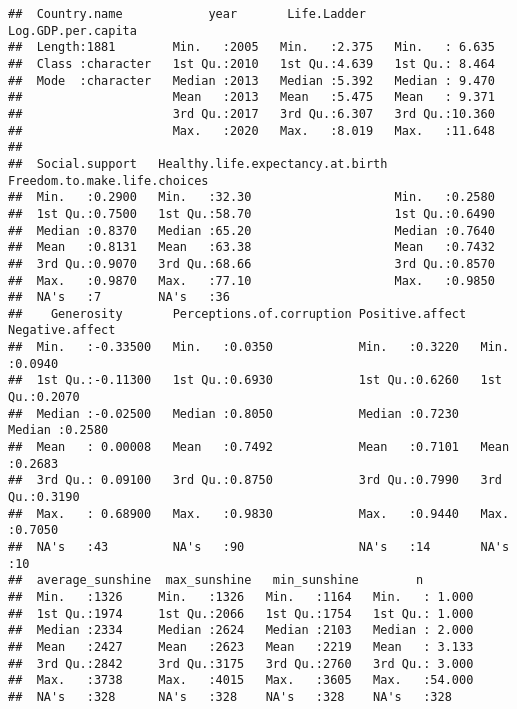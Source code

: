 \documentclass[
]{article}
\begin{document}
\begin{verbatim}
##  Country.name            year       Life.Ladder    Log.GDP.per.capita
##  Length:1881        Min.   :2005   Min.   :2.375   Min.   : 6.635    
##  Class :character   1st Qu.:2010   1st Qu.:4.639   1st Qu.: 8.464    
##  Mode  :character   Median :2013   Median :5.392   Median : 9.470    
##                     Mean   :2013   Mean   :5.475   Mean   : 9.371    
##                     3rd Qu.:2017   3rd Qu.:6.307   3rd Qu.:10.360    
##                     Max.   :2020   Max.   :8.019   Max.   :11.648    
##                                                                      
##  Social.support   Healthy.life.expectancy.at.birth Freedom.to.make.life.choices
##  Min.   :0.2900   Min.   :32.30                    Min.   :0.2580              
##  1st Qu.:0.7500   1st Qu.:58.70                    1st Qu.:0.6490              
##  Median :0.8370   Median :65.20                    Median :0.7640              
##  Mean   :0.8131   Mean   :63.38                    Mean   :0.7432              
##  3rd Qu.:0.9070   3rd Qu.:68.66                    3rd Qu.:0.8570              
##  Max.   :0.9870   Max.   :77.10                    Max.   :0.9850              
##  NA's   :7        NA's   :36                                                   
##    Generosity       Perceptions.of.corruption Positive.affect  Negative.affect 
##  Min.   :-0.33500   Min.   :0.0350            Min.   :0.3220   Min.   :0.0940  
##  1st Qu.:-0.11300   1st Qu.:0.6930            1st Qu.:0.6260   1st Qu.:0.2070  
##  Median :-0.02500   Median :0.8050            Median :0.7230   Median :0.2580  
##  Mean   : 0.00008   Mean   :0.7492            Mean   :0.7101   Mean   :0.2683  
##  3rd Qu.: 0.09100   3rd Qu.:0.8750            3rd Qu.:0.7990   3rd Qu.:0.3190  
##  Max.   : 0.68900   Max.   :0.9830            Max.   :0.9440   Max.   :0.7050  
##  NA's   :43         NA's   :90                NA's   :14       NA's   :10      
##  average_sunshine  max_sunshine   min_sunshine        n         
##  Min.   :1326     Min.   :1326   Min.   :1164   Min.   : 1.000  
##  1st Qu.:1974     1st Qu.:2066   1st Qu.:1754   1st Qu.: 1.000  
##  Median :2334     Median :2624   Median :2103   Median : 2.000  
##  Mean   :2427     Mean   :2623   Mean   :2219   Mean   : 3.133  
##  3rd Qu.:2842     3rd Qu.:3175   3rd Qu.:2760   3rd Qu.: 3.000  
##  Max.   :3738     Max.   :4015   Max.   :3605   Max.   :54.000  
##  NA's   :328      NA's   :328    NA's   :328    NA's   :328
\end{verbatim}
\end{document}
